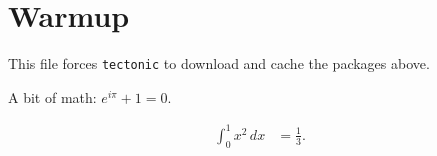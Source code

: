 \documentclass{article}
\begin{document}
\section{Warmup}
This file forces \texttt{tectonic} to download and cache the packages above.

A bit of math: $e^{i\pi} + 1 = 0$.

\begin{align}
  \int_0^{1} x^2\,dx &= \tfrac{1}{3}.
\end{align}

\end{document}
